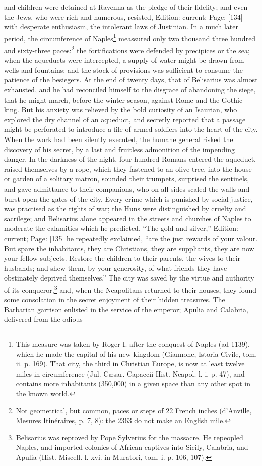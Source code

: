 and children were detained at Ravenna as the pledge of their fidelity; and even the Jews, who were rich and numerous, resisted, Edition: current; Page: [134] with desperate enthusiasm, the intolerant laws of Justinian. In a much later period, the circumference of Naples\footnote{This measure was taken by Roger I. after the conquest of Naples (ad 1139), which he made the capital of his new kingdom (Giannone, Istoria Civile, tom. ii. p. 169). That city, the third in Christian Europe, is now at least twelve miles in circumference (Jul. Cæsar. Capaccii Hist. Neapol. l. i. p. 47), and contains more inhabitants (350,000) in a given space than any other spot in the known world.} meassured only two thousand three hundred and sixty-three paces:\footnote{Not geometrical, but common, paces or steps of 22 French inches (d\texthebrew{}’Anville, Mesures Itinéraires, p. 7, 8): the 2363 do not make an English mile.} the fortifications were defended by precipices or the sea; when the aqueducts were intercepted, a supply of water might be drawn from wells and fountains; and the stock of provisions was sufficient to consume the patience of the besiegers. At the end of twenty days, that of Belisarius was almost exhausted, and he had reconciled himself to the disgrace of abandoning the siege, that he might march, before the winter season, against Rome and the Gothic king. But his anxiety was relieved by the bold curiosity of an Isaurian, who explored the dry channel of an aqueduct, and secretly reported that a passage might be perforated to introduce a file of armed soldiers into the heart of the city. When the work had been silently executed, the humane general risked the discovery of his secret, by a last and fruitless admonition of the impending danger. In the darkness of the night, four hundred Romans entered the aqueduct, raised themselves by a rope, which they fastened to an olive tree, into the house or garden of a solitary matron, sounded their trumpets, surprised the sentinels, and gave admittance to their companions, who on all sides scaled the walls and burst open the gates of the city. Every crime which is punished by social justice, was practised as the rights of war; the Huns were distinguished by cruelty and sacrilege; and Belisarius alone appeared in the streets and churches of Naples to moderate the calamities which he predicted. \texthebrew{“}The gold and silver,\texthebrew{}” Edition: current; Page: [135] he repeatedly exclaimed, \texthebrew{“}are the just rewards of your valour. But spare the inhabitants, they are Christians, they are suppliants, they are now your fellow-subjects. Restore the children to their parents, the wives to their husbands; and shew them, by your generosity, of what friends they have obstinately deprived themselves.\texthebrew{}” The city was saved by the virtue and authority of its conqueror,\footnote{Belisarius was reproved by Pope Sylverius for the massacre. He repeopled Naples, and imported colonies of African captives into Sicily, Calabria, and Apulia (Hist. Miscell. l. xvi. in Muratori, tom. i. p. 106, 107).} and, when the Neapolitans returned to their houses, they found some consolation in the secret enjoyment of their hidden treasures. The Barbarian garrison enlisted in the service of the emperor; Apulia and Calabria, delivered from the odious 